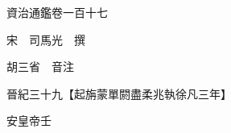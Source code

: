 










 


 
 


 

  
  
  
  
  





  
  
  
  
  
 
  

  

  
  
  



  

 
 

  
   




  

  
  


  　　資治通鑑卷一百十七

　　宋　司馬光　撰

　　胡三省　音注

　　晉紀三十九【起旃蒙單閼盡柔兆執徐凡三年】

　　安皇帝壬


